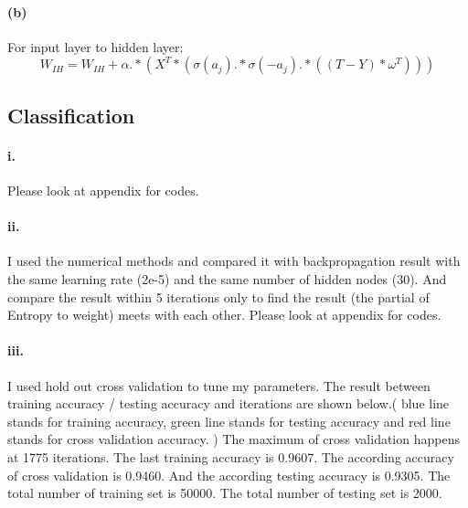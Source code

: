 \documentclass{article} %
\begin{document}
		\paragraph{(b)}
		For	input layer to hidden layer:
		\begin{equation*}
		W_{IH} = W_{IH}  + \alpha .* (X^T * (\sigma(a_j).*\sigma(-a_j).*((T-Y)*\omega^T)))
		\end{equation*}



	\subsection{Classification}
	\paragraph{i.}
	Please look at appendix for codes. 
	\paragraph{ii.}
	I used the numerical methods and compared it with backpropagation result with the same learning rate (2e-5) and the same number of hidden nodes (30). And compare the result within 5 iterations only to find the result (the partial of Entropy to weight) meets with each other. Please look at appendix for codes.
	\paragraph{iii.}
	I used hold out cross validation to tune my parameters. The result between training accuracy / testing accuracy and iterations are shown below.( blue line stands for training accuracy, green line stands for testing accuracy and red line stands for cross validation accuracy. )
	The maximum of cross validation happens at 1775 iterations. The last training accuracy is 0.9607. The according accuracy of cross validation is 0.9460. And the according testing accuracy is 0.9305. The total number of training set is 50000. The total number of testing set is 2000.
\end{document}
